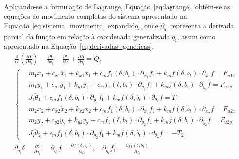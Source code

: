 Aplicando-se a formulação de Lagrange, Equação~\ref{eq:lagrange}, obtém-se as equações do movimento completas do sistema apresentado na Equação~\ref{eq:sistema_movimento_expandido}, onde $\partial_{q_i}$ representa a derivada parcial  da função em relação à coordenada generalizada $q_i$, assim como apresentado na Equação~\ref{eq:derivadas_genericas}.
\begin{gather}
	\frac{\mathrm{d}}{\mathrm{d}t} \left( \frac{\partial T}{\partial \dot{q}_i} \right) - \frac{\partial T}{\partial q_i} + \frac{\partial U}{\partial q_i} + \frac{\partial R}{\partial \dot{q}_i} = Q_i
	\label{eq:lagrange}
\\
	\left\{
	\begin{aligned}
		& m_1\ddot{x}_1 + c_{x1}\dot{x}_1 + k_{x1}x_1 + c_m f_1(\delta, b_t) \cdot \partial_{\dot{x}_1}f_1 + k_m f(\delta, b_t) \cdot \partial_{x_1}f = F_{u1x} \\
		& m_1\ddot{y}_1 + c_{y1}\dot{y}_1 + k_{y1}y_1 + c_m f_1(\delta, b_t) \cdot \partial_{\dot{y}_1}f_1 + k_m f(\delta, b_t) \cdot \partial_{y_1}f = F_{u1y} \\
		& J_1\ddot{\theta}_1 + c_m f_1(\delta, b_t) \cdot \partial_{\dot{\theta}_1}f_1 + k_m f(\delta, b_t) \cdot \partial_{\theta_1}f = T_1 \\
		& m_2\ddot{x}_2 + c_{x2}\dot{x}_2 + k_{x2}x_2 + c_m f_1(\delta, b_t) \cdot \partial_{\dot{x}_2}f_1 + k_m f(\delta, b_t) \cdot \partial_{x_2}f = F_{u2x} \\
		& m_2\ddot{y}_2 + c_{y2}\dot{y}_2 + k_{y2}y_2 + c_m f_1(\delta, b_t) \cdot \partial_{\dot{y}_2}f_1 + k_m f(\delta, b_t) \cdot \partial_{y_2}f = F_{u2y} \\
		& J_2\ddot{\theta}_2 + c_m f_1(\delta, b_t) \cdot \partial_{\dot{\theta}_2}f_1 + k_m f(\delta, b_t) \cdot \partial_{\theta_2}f = -T_2
	\end{aligned}
	\right.
	\label{eq:sistema_movimento_expandido}
\\
	\partial_{q_i}\delta = \frac{\partial \delta}{\partial q_i}, \quad \partial_{q_i}f = \frac{\partial f(\delta, b_t)}{\partial q_i}, \quad \partial_{\dot{q}_i}f_1 = \frac{\partial f_1(\delta, b_t)}{\partial \dot{q}_i}
	\label{eq:derivadas_genericas}
\end{gather}

